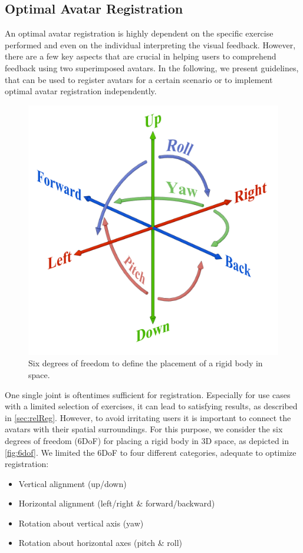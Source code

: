 \subsection*{Optimal Avatar Registration \label{sec:optimalReg}}
An optimal avatar registration is highly dependent on the specific exercise performed and even on the individual interpreting the visual feedback. However, there are a few key aspects that are crucial in helping users to comprehend feedback using two superimposed avatars. In the following, we present guidelines, that can be used to register avatars for a certain scenario or to implement optimal avatar registration independently.

\begin{figure}[h]
	\centering
	\includegraphics[width=0.5\linewidth]{pictures/Gizmos.png}
	\caption[Six degrees of freedom to define the placement of a rigid body.]{Six degrees of freedom to define the placement of a rigid body in space.}
	\label{fig:6dof}
\end{figure}

One single joint is oftentimes sufficient for registration. Especially for use cases with a limited selection of exercises, it can lead to satisfying results, as described in \autoref{sec:relReg}. However, to avoid irritating users it is important to connect the avatars with their spatial surroundings. For this purpose, we consider the six degrees of freedom (6DoF) for placing a rigid body in 3D space, as depicted in \autoref{fig:6dof}. We limited the 6DoF to four different categories, adequate to optimize registration:
\begin{itemize}
	\setlength{\itemsep}{-0.3cm}
	\item Vertical alignment (up/down)
	\item Horizontal alignment (left/right \& forward/backward)
	\item Rotation about vertical axis (yaw)
	\item Rotation about horizontal axes (pitch \& roll)
\end{itemize}

